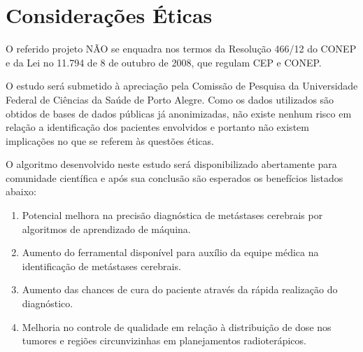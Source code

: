 \chapter{Considerações Éticas}\label{chap:eticas}

O referido projeto NÃO se enquadra nos termos da Resolução 466/12 do CONEP e da Lei no 11.794 de 8 de outubro de 2008, que regulam CEP e CONEP.

O estudo será submetido à apreciação pela Comissão de Pesquisa da Universidade Federal de Ciências da Saúde de Porto Alegre. Como os dados utilizados são obtidos de bases de dados públicas já anonimizadas, não existe nenhum risco em relação a identificação dos pacientes envolvidos e portanto não existem implicações no que se referem às questões éticas.

O algoritmo desenvolvido neste estudo será disponibilizado abertamente para comunidade científica e após sua conclusão são esperados os benefícios listados abaixo:
\begin{enumerate}
    \item Potencial melhora na precisão diagnóstica de metástases cerebrais por algoritmos de aprendizado de máquina.
    \item Aumento do ferramental disponível para auxílio da equipe médica na identificação de metástases cerebrais.
    \item Aumento das chances de cura do paciente através da rápida realização do diagnóstico.
    \item Melhoria no controle de qualidade em relação à distribuição de dose nos tumores e regiões circunvizinhas em planejamentos radioterápicos.
\end{enumerate}
